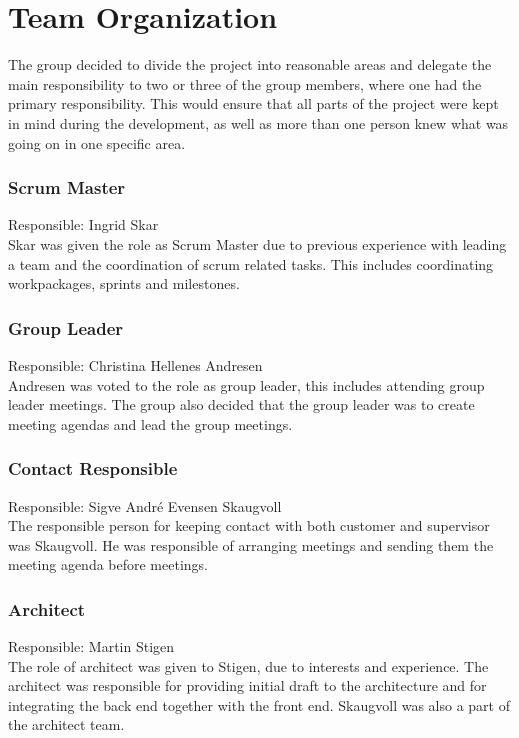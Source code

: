 \section{Team Organization}\label{projectOrganisation}
The group decided to divide the project into reasonable areas and delegate the main responsibility to two or three of the group members, where one had the primary responsibility. This would ensure that all parts of the project were kept in mind during the development, as well as more than one person knew what was going on in one specific area.

\subsubsection{Scrum Master}
Responsible: Ingrid Skar \\
Skar was given the role as Scrum Master due to previous experience with leading a team and the coordination of scrum related tasks. This includes coordinating workpackages, sprints and milestones.

\subsubsection{Group Leader}
Responsible: Christina Hellenes Andresen \\
Andresen was voted to the role as group leader, this includes attending group leader meetings. The group also decided that the group leader was to create meeting agendas and lead the group meetings. 

\subsubsection{Contact Responsible}
Responsible: Sigve André Evensen Skaugvoll \\
The responsible person for keeping contact with both customer and supervisor was Skaugvoll. He was responsible of arranging meetings and sending them the meeting agenda before meetings.

\subsubsection{Architect}
Responsible: Martin Stigen \\
The role of architect was given to Stigen, due to interests and experience. The architect was responsible for providing initial draft to the architecture and for integrating the back end together with the front end. Skaugvoll was also a part of the architect team.

